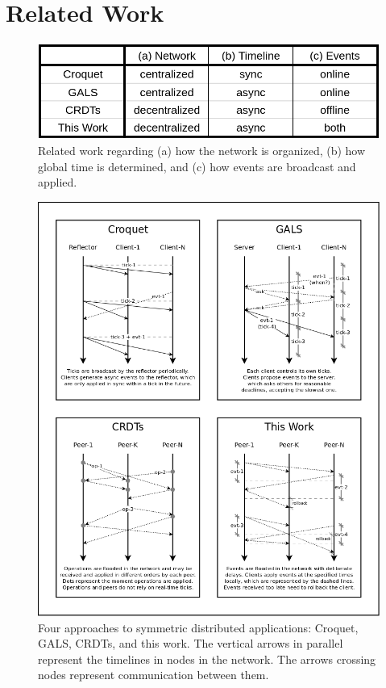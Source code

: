 \documentclass[sn-mathphys,iicol]{sn-jnl}%
\begin{document}
\section{Related Work}
\label{sec.related}

\begin{figure}
  \centering
  \includegraphics[width=\linewidth]{table}
  \caption{
    Related work regarding
        (a) how the network is organized,
        (b) how global time is determined, and
        (c) how events are broadcast and applied.
    \label{fig.table}
  }
\end{figure}

\begin{figure}
  \centering
  \includegraphics[width=\linewidth]{algos}
  \caption{
    \label{fig.algos}
    Four approaches to symmetric distributed applications: Croquet, GALS,
    CRDTs, and this work.
    The vertical arrows in parallel represent the timelines in nodes in the
    network.
    The arrows crossing nodes represent communication between them.
  }
\end{figure}
\end{document}
